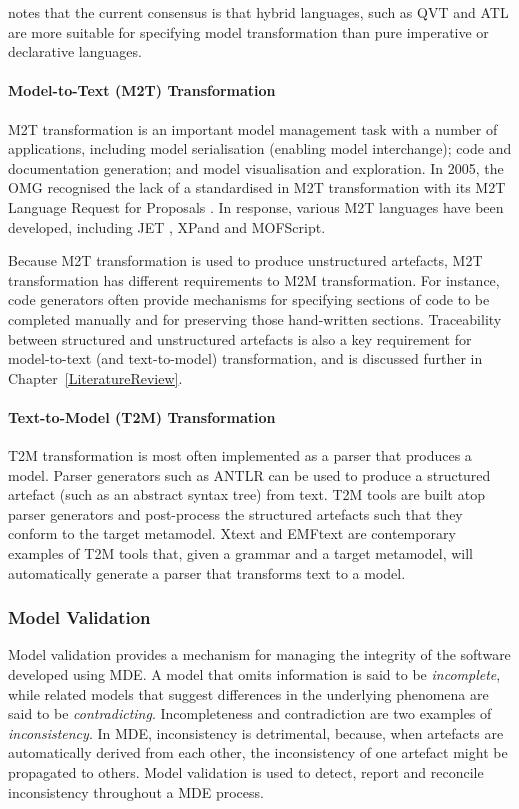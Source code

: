 \cite{kolovos08etl} notes that the current consensus is that hybrid languages, such as QVT \cite{qvt} and ATL \cite{jouault05transforming} are more suitable for specifying model transformation than pure imperative or declarative languages. 

\paragraph{Model-to-Text (M2T) Transformation} M2T transformation is an important model management task with a number of applications, including model serialisation (enabling model interchange); code and documentation generation; and model visualisation and exploration.  In 2005, the OMG \cite{omg} recognised the lack of a standardised in M2T transformation with its M2T Language Request for Proposals \cite{m2trfp}. In response, various M2T languages have been developed, including JET \cite{jet}, XPand 
and MOFScript.

Because M2T transformation is used to produce unstructured artefacts, M2T transformation has different requirements to M2M transformation. For instance, code generators often provide mechanisms for specifying sections of code to be completed manually and for preserving those hand-written sections. Traceability between structured and unstructured artefacts is also a key requirement for model-to-text (and text-to-model) transformation, and is discussed further in Chapter~\ref{LiteratureReview}.

\paragraph{Text-to-Model (T2M) Transformation} T2M transformation is most often implemented as a parser that produces a model. Parser generators such as ANTLR \cite{antlrbook} can be used to produce a structured artefact (such as an abstract syntax tree) from text. T2M tools are built atop parser generators and post-process the structured artefacts such that they conform to the target metamodel. Xtext \cite{xtext} and EMFtext \cite{emftext} are contemporary examples of T2M tools that, given a grammar and a target metamodel, will automatically generate a parser that transforms text to a model.

\subsubsection{Model Validation}
Model validation provides a mechanism for managing the integrity of the software developed using MDE. A model that omits information is said to be \emph{incomplete}, while related models that suggest differences in the underlying phenomena are said to be \emph{contradicting}. Incompleteness and contradiction are two examples of \emph{inconsistency}. In MDE, inconsistency is detrimental, because, when artefacts are automatically derived from each other, the inconsistency of one artefact might be propagated to others. Model validation is used to detect, report and reconcile inconsistency throughout a MDE process.

